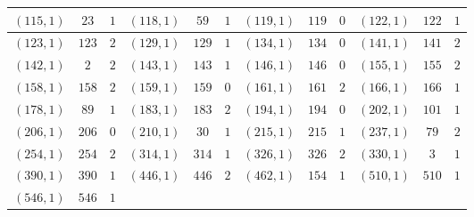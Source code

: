 \documentclass[11pt,reqno]{amsart}
\theoremstyle{definition}
\begin{document}
{\begin{longtable}{|c|c|c||c|c|c||c|c|c||c|c|c|}
\\ \hline
$ (
115 , 1 )$ & $
23 $ & $ 1 $
 & 
$ (
118 , 1 )$ & $
59 $ & $ 1 $
&
$ (
119 , 1 )$ & $
119 $ & $ 0 $
 & 
$ (
122 , 1 )$ & $
122 $ & $ 1 $
\\ \hline
$ (
123 , 1 )$ & $
123 $ & $ 2 $
&
$ (
129 , 1 )$ & $
129 $ & $ 1 $
&
$ (
134 , 1 )$ & $
134 $ & $ 0 $
 & 
$ (
141 , 1 )$ & $
141 $ & $ 2 $
\\ \hline
$ (
142 , 1 )$ & $
2 $ & $ 2 $
 & 
$ (
143 , 1 )$ & $
143 $ & $ 1 $
&
$ (
146 , 1 )$ & $
146 $ & $ 0 $
&
$ (
155 , 1 )$ & $
155 $ & $ 2 $
\\ \hline
$ (
158 , 1 )$ & $
158 $ & $ 2 $
 & 
$ (
159 , 1 )$ & $
159 $ & $ 0 $
&
$ (
161 , 1 )$ & $
161 $ & $ 2 $
 & 
$ (
166 , 1 )$ & $
166 $ & $ 1 $
\\ \hline
$ (
178 , 1 )$ & $
89 $ & $ 1 $
&
$ (
183 , 1 )$ & $
183 $ & $ 2 $
&
$ (
194 , 1 )$ & $
194 $ & $ 0 $
 & 
$ (
202 , 1 )$ & $
101 $ & $ 1 $
\\ \hline
$ (
206 , 1 )$ & $
206 $ & $ 0 $
 & 
$ (
210 , 1 )$ & $
30 $ & $ 1 $
&
$ (
215 , 1 )$ & $
215 $ & $ 1 $
&
$ (
237 , 1 )$ & $
79 $ & $ 2 $
\\ \hline
$ (
254 , 1 )$ & $
254 $ & $ 2 $
 & 
$ (
314 , 1 )$ & $
314 $ & $ 1 $
&
$ (
326 , 1 )$ & $
326 $ & $ 2 $
 & 
$ (
330 , 1 )$ & $
3 $ & $ 1 $
\\ \hline
$ (
390 , 1 )$ & $
390 $ & $ 1 $
&
$ (
446 , 1 )$ & $
446 $ & $ 2 $
&
$ (
462 , 1 )$ & $
154 $ & $ 1 $
 & 
$ (
510 , 1 )$ & $
510 $ & $ 1 $
\\ \hline
$ ( 546 , 1 )$ & $
546 $ & $ 1 $ & & & 
& & &  & & & \\ \hline
\end{longtable}
}
\end{document}
